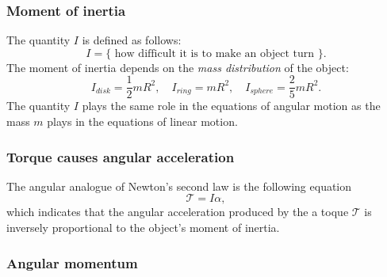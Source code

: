 \documentclass[letterpaper,9pt,journal]{IEEEtran}
\newcommand{\be}{\begin{equation}}
\newcommand{\ee}{\end{equation}}
\begin{document}


%


\subsubsection{Moment of inertia}
The quantity $I$ is defined as follows:
\[
  I = \{ \text{ how difficult it is to make an object turn } \}.
\]
The moment of inertia depends on the \emph{mass distribution} of the object:
\[
 I_{disk} = \frac{1}{2}mR^2, \quad I_{ring}=mR^2, \quad  I_{sphere} = \frac{2}{5} mR^2.
\]
The quantity $I$ plays the same role in the equations of angular motion 
as the mass $m$ plays in the equations of linear motion.

\subsubsection{Torque causes angular acceleration}
The angular analogue of Newton's second law is the following equation
\be
  \mathcal{T} = I \alpha,
  \label{angularFeqMA}
\ee
which indicates that the angular acceleration produced
by the a toque $\mathcal{T}$ is inversely proportional to the object's moment of inertia.


\subsubsection{Angular momentum}
\end{document}
